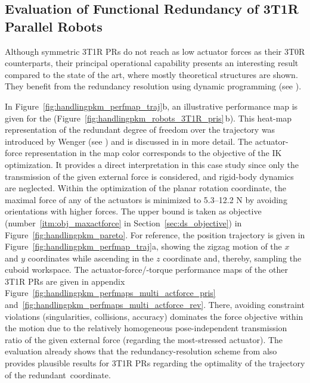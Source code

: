 \subsection{Evaluation of Functional Redundancy of 3T1R Parallel Robots}
\label{sec:eval_handling_results_taskred}

Although symmetric 3T1R PRs do not reach as low actuator forces as their 3T0R counterparts, their principal operational capability presents an interesting result compared to the state of the art, where mostly theoretical structures are shown.
They benefit from the redundancy resolution using dynamic programming (see \cite{Schappler2023_ICINCOLNEE}). %

In Figure~\ref{fig:handlingpkm_perfmap_traj}b, an illustrative performance map is given for the  (Figure~\ref{fig:handlingpkm_robots_3T1R_pris}\,b).
This heat-map representation of the redundant degree of freedom over the trajectory was introduced by Wenger (see \cite{RevelesWenoth2016}) and is discussed in \cite{Schappler2023_ICINCOLNEE} in more detail.
The actuator-force representation in the map color corresponds to the objective of the IK optimization. 
It provides a direct interpretation in this case study since only the transmission of the given external force is considered, and rigid-body dynamics are neglected.
Within the optimization of the planar rotation coordinate, the maximal force of any of the actuators is minimized to 
5.3--12.2 N by avoiding orientations with higher forces. %
The upper bound is taken as objective (number~\ref{itm:obj_maxactforce} in Section~\ref{sec:ds_objective}) in Figure~\ref{fig:handlingpkm_pareto}.
For reference, the position trajectory is given in Figure~\ref{fig:handlingpkm_perfmap_traj}a, showing the zigzag motion of the $x$ and $y$ coordinates while ascending in the $z$ coordinate and, thereby, sampling the cuboid workspace.
The actuator-force/-torque performance maps of the other 3T1R PRs are given in appendix Figure~\ref{fig:handlingpkm_perfmaps_multi_actforce_pris} and~\ref{fig:handlingpkm_perfmaps_multi_actforce_rev}.
There, avoiding constraint violations (singularities, collisions, accuracy) dominates the force objective within the motion due to the relatively homogeneous pose-independent transmission ratio of the given external force (regarding the most-stressed actuator).
The evaluation already shows that the redundancy-resolution scheme from \cite{Schappler2023_ICINCOLNEE} also provides plausible results for 3T1R PRs regarding the optimality of the trajectory of the redundant~coordinate. 

